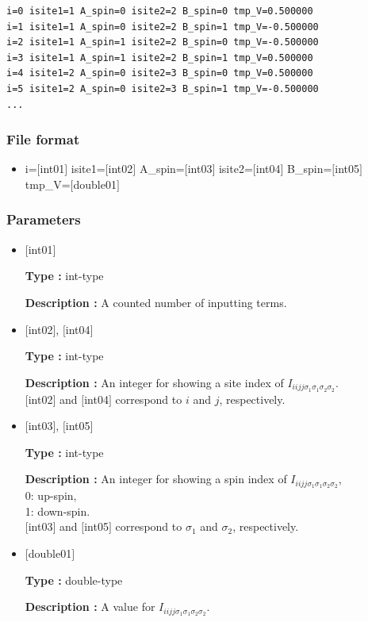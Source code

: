 \begin{minipage}{12.5cm}
\begin{screen}
\begin{verbatim}
i=0 isite1=1 A_spin=0 isite2=2 B_spin=0 tmp_V=0.500000 
i=1 isite1=1 A_spin=0 isite2=2 B_spin=1 tmp_V=-0.500000 
i=2 isite1=1 A_spin=1 isite2=2 B_spin=0 tmp_V=-0.500000 
i=3 isite1=1 A_spin=1 isite2=2 B_spin=1 tmp_V=0.500000 
i=4 isite1=2 A_spin=0 isite2=3 B_spin=0 tmp_V=0.500000 
i=5 isite1=2 A_spin=0 isite2=3 B_spin=1 tmp_V=-0.500000 
...
\end{verbatim}
\end{screen}
\end{minipage}

\subsubsection{File format}
 \begin{itemize}
   \item  i=$[$int01$]$ isite1=$[$int02$]$  A\_spin=$[$int03$]$ isite2=$[$int04$]$  B\_spin=$[$int05$]$ tmp\_V=$[$double01$]$ 
 \end{itemize}
 
\subsubsection{Parameters}
 \begin{itemize}

    \item  $[$int01$]$ 
   
    {\bf Type :} int-type

   {\bf Description :} A counted number of inputting terms.
   
   \item  $[$int02$]$, $[$int04$]$
   
    {\bf Type :} int-type

    {\bf Description :}   An integer for showing a site index of  $I_{iijj\sigma_1\sigma_1\sigma_2\sigma_2}$. \\
    $[$int02$]$ and $[$int04$]$ correspond to $i$ and $j$, respectively.
 
   \item  $[$int03$]$, $[$int05$]$  
   
    {\bf Type :} int-type

   {\bf Description :}  An integer for showing a spin index of $I_{iijj\sigma_1\sigma_1\sigma_2\sigma_2}$,\\
   0: up-spin,\\
   1: down-spin.\\
   $[$int03$]$ and $[$int05$]$ correspond to  $\sigma_1$ and $\sigma_2$, respectively.\\
 
   \item  $[$double01$]$ 
   
    {\bf Type :} double-type

   {\bf Description :} A value for $I_{iijj\sigma_1\sigma_1\sigma_2\sigma_2}$.
  
\end{itemize}

